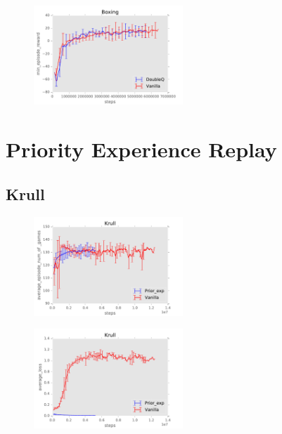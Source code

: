 \documentclass{sig-alternate}
\begin{document}
\begin{figure}[h!]
    \centering
    \includegraphics[width=0.5\textwidth]{../results/Boxing/Comparisons/DoubleQ/DoubleQ-baseline-min_episode_reward.pdf}
\end{figure}
\FloatBarrier


\section{Priority Experience Replay}\label{Appendix Priority Experience Replay}

\subsection{Krull}\label{Appendix prior krill}

\begin{figure}
    \centering
    \includegraphics[width=0.5\textwidth]{../results/Krull/Comparisons/Prior_exp/Prior_exp-baseline-average_episode_num_of_games.pdf}
\end{figure}

\begin{figure}
    \centering
    \includegraphics[width=0.5\textwidth]{../results/Krull/Comparisons/Prior_exp/Prior_exp-baseline-average_loss.pdf}
\end{figure}
\end{document}
